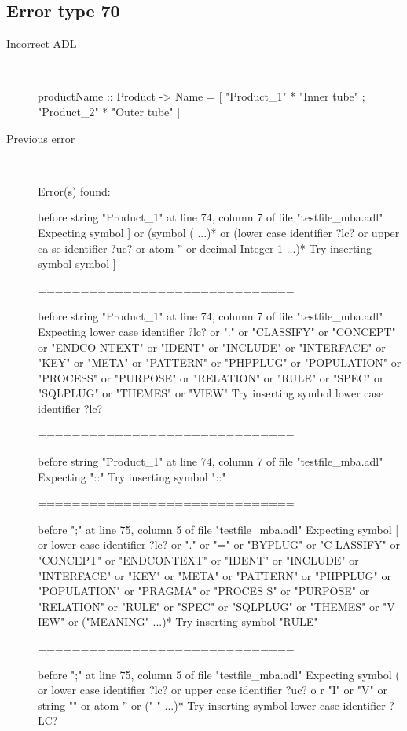 \hrulefill

\subsection{Error type 70}
  \begin{description}
  \item[Incorrect ADL]~\\
\begin{adl}
productName :: Product -> Name
  = [ "Product_1" * "Inner tube"
    ; "Product_2" * "Outer tube"
    ]\end{adl}
  \item[Previous error]~\\
\begin{haskell}
Error(s) found:

before string "Product_1" at line 74, column 7 of file "testfile_mba.adl"
Expecting symbol ] or (symbol ( ...)* or (lower case identifier ?lc? or upper ca
se identifier ?uc? or atom '' or decimal Integer 1 ...)*
Try inserting symbol symbol ]

==============================

before string "Product_1" at line 74, column 7 of file "testfile_mba.adl"
Expecting lower case identifier ?lc? or "." or "CLASSIFY" or "CONCEPT" or "ENDCO
NTEXT" or "IDENT" or "INCLUDE" or "INTERFACE" or "KEY" or "META" or "PATTERN" or
 "PHPPLUG" or "POPULATION" or "PROCESS" or "PURPOSE" or "RELATION" or "RULE" or
"SPEC" or "SQLPLUG" or "THEMES" or "VIEW"
Try inserting symbol lower case identifier ?lc?

==============================

before string "Product_1" at line 74, column 7 of file "testfile_mba.adl"
Expecting "::"
Try inserting symbol "::"

==============================

before ";" at line 75, column 5 of file "testfile_mba.adl"
Expecting symbol [ or lower case identifier ?lc? or "." or "=" or "BYPLUG" or "C
LASSIFY" or "CONCEPT" or "ENDCONTEXT" or "IDENT" or "INCLUDE" or "INTERFACE" or
"KEY" or "META" or "PATTERN" or "PHPPLUG" or "POPULATION" or "PRAGMA" or "PROCES
S" or "PURPOSE" or "RELATION" or "RULE" or "SPEC" or "SQLPLUG" or "THEMES" or "V
IEW" or ("MEANING" ...)*
Try inserting symbol "RULE"

==============================

before ";" at line 75, column 5 of file "testfile_mba.adl"
Expecting symbol ( or lower case identifier ?lc? or upper case identifier ?uc? o
r "I" or "V" or string "" or atom '' or ("-" ...)*
Try inserting symbol lower case identifier ?LC?


\end{haskell}
\end{description}
